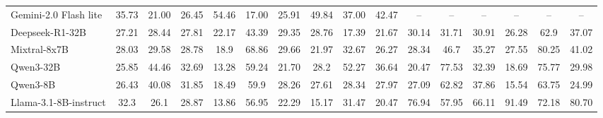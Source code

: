 \begin{table}[]
{\begin{tabular}{l|ccc|ccc|ccc|ccc|ccc}
Gemini-2.0 Flash lite                                & 35.73           & 21.00        & 26.45        & 54.46           & 17.00        & 25.91        & 49.84           & 37.00        & 42.47        & --               & --            & --            & --                & --            & --            \\
Deepseek-R1-32B                                      & 27.21           & 28.44        & 27.81        & 22.17           & 43.39        & 29.35        & 28.76           & 17.39        & 21.67        & 30.14            & 31.71         & 30.91         & 26.28             & 62.9          & 37.07         \\
Mixtral-8x7B                                         & 28.03           & 29.58        & 28.78        & 18.9            & 68.86        & 29.66        & 21.97           & 32.67        & 26.27        & 28.34            & 46.7          & 35.27         & 27.55             & 80.25         & 41.02         \\
Qwen3-32B                                            & 25.85           & 44.46        & 32.69        & 13.28           & 59.24        & 21.70        & 28.2            & 52.27        & 36.64        & 20.47            & 77.53         & 32.39         & 18.69             & 75.77         & 29.98         \\
Qwen3-8B                                             & 26.43           & 40.08        & 31.85        & 18.49           & 59.9         & 28.26        & 27.61           & 28.34        & 27.97        & 27.09            & 62.82         & 37.86         & 15.54             & 63.75         & 24.99         \\
Llama-3.1-8B-instruct                                & 32.3            & 26.1         & 28.87        & 13.86           & 56.95        & 22.29        & 15.17           & 31.47        & 20.47        & 76.94            & 57.95         & 66.11         & 91.49             & 72.18         & 80.70         \\ \hline
\end{tabular}
}
\vspace{-0.5em}
\label{tab:ers}
\end{table}


